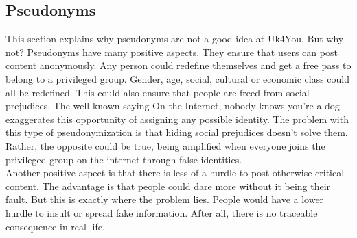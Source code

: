 \subsection{Pseudonyms}
This section explains why pseudonyms are not a good idea at Uk4You.
But why not? Pseudonyms have many positive aspects.
They ensure that users can post content anonymously.
Any person could redefine themselves and get a free pass to belong to a privileged group.
Gender, age, social, cultural or economic class could all be redefined.
This could also ensure that people are freed from social prejudices.
The well-known saying \glqq On the Internet, nobody knows you're a dog\grqq{} exaggerates this opportunity of assigning any possible identity\cite{steiner-internet-dog}.
The problem with this type of pseudonymization is that hiding social prejudices doesn't solve them.
Rather, the opposite could be true, being amplified when everyone joins the privileged group on the internet through false identities.\\

Another positive aspect is that there is less of a hurdle to post otherwise critical content.
The advantage is that people could dare more without it being their fault.
But this is exactly where the problem lies.
People would have a lower hurdle to insult or spread fake information.
After all, there is no traceable consequence in real life.\\




